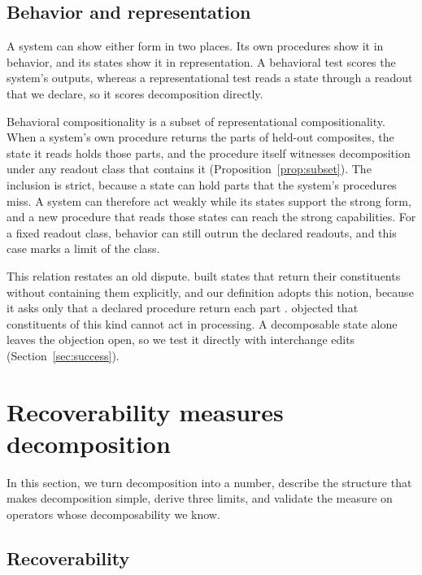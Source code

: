 \documentclass[10pt]{article}
\theoremstyle{plain}
\theoremstyle{remark}
\begin{document}
\subsection{Behavior and representation}
\label{sec:subset}

A system can show either form in two places. Its own procedures show it in behavior, and its states show it in representation. A behavioral test scores the system's outputs, whereas a representational test reads a state through a readout that we declare, so it scores decomposition directly.

Behavioral compositionality is a subset of representational compositionality. When a system's own procedure returns the parts of held-out composites, the state it reads holds those parts, and the procedure itself witnesses decomposition under any readout class that contains it (Proposition~\ref{prop:subset}). The inclusion is strict, because a state can hold parts that the system's procedures miss. A system can therefore act weakly while its states support the strong form, and a new procedure that reads those states can reach the strong capabilities. For a fixed readout class, behavior can still outrun the declared readouts, and this case marks a limit of the class.

This relation restates an old dispute. \citet{smolensky1990} built states that return their constituents without containing them explicitly, and our definition adopts this notion, because it asks only that a declared procedure return each part \citep[cf.][]{vangelder1990}. \citet{fodor1990} objected that constituents of this kind cannot act in processing. A decomposable state alone leaves the objection open, so we test it directly with interchange edits (Section~\ref{sec:success}).

\section{Recoverability measures decomposition}
\label{sec:repcomp}

In this section, we turn decomposition into a number, describe the structure that makes decomposition simple, derive three limits, and validate the measure on operators whose decomposability we know.

\subsection{Recoverability}
\end{document}
